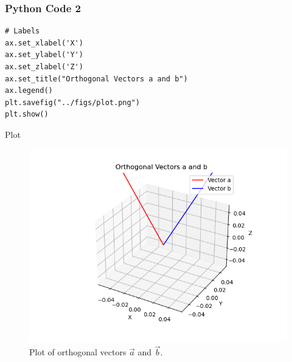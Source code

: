 \documentclass{beamer}
\begin{document}
\begin{frame}[fragile]
    \frametitle{Python Code 2}
    \begin{lstlisting}
# Labels
ax.set_xlabel('X')
ax.set_ylabel('Y')
ax.set_zlabel('Z')
ax.set_title("Orthogonal Vectors a and b")
ax.legend()
plt.savefig("../figs/plot.png")
plt.show()
    \end{lstlisting}
\end{frame}

\begin{frame}{Plot}
    \begin{figure}
        \centering
        \includegraphics[width=0.5\columnwidth]{../figs/plot.png}
        \caption{Plot of orthogonal vectors $\vec{a}$ and $\vec{b}$.}
        \label{fig:fig}
    \end{figure}
\end{frame}
\end{document}
